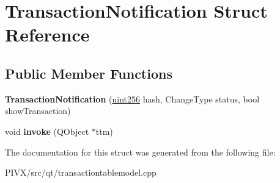 \hypertarget{struct_transaction_notification}{}\section{Transaction\+Notification Struct Reference}
\label{struct_transaction_notification}
\subsection*{Public Member Functions}
\begin{DoxyCompactItemize}
\item 
\mbox{\label{struct_transaction_notification_a9c98f1364757e2a6d357d93c7c5fbd71}} 
{\bfseries Transaction\+Notification} (\mbox{\hyperlink{classuint256}{uint256}} hash, Change\+Type status, bool show\+Transaction)
\item 
\mbox{\label{struct_transaction_notification_a6351a5b93f908a2df2e854e08178edb3}} 
void {\bfseries invoke} (Q\+Object $\ast$ttm)
\end{DoxyCompactItemize}


The documentation for this struct was generated from the following file\+:\begin{DoxyCompactItemize}
\item 
P\+I\+V\+X/src/qt/transactiontablemodel.\+cpp\end{DoxyCompactItemize}
